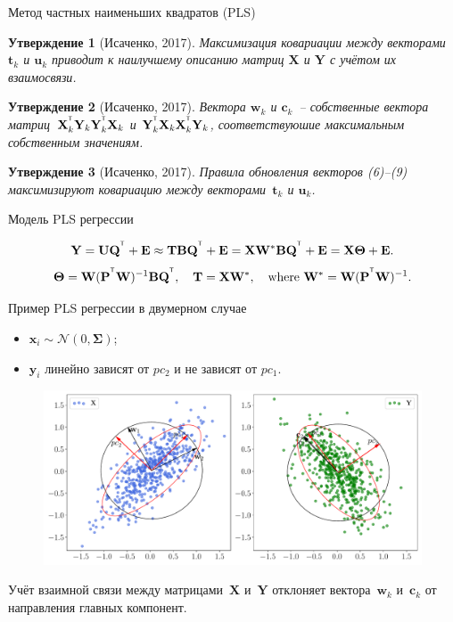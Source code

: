 \documentclass[9pt]{beamer}
\newcommand{\bc}{\mathbf{c}}
\newcommand{\bt}{\mathbf{t}}
\newcommand{\bu}{\mathbf{u}}
\newcommand{\bw}{\mathbf{w}}
\newcommand{\bx}{\mathbf{x}}
\newcommand{\by}{\mathbf{y}}
\newcommand{\bB}{\mathbf{B}}
\newcommand{\bE}{\mathbf{E}}
\newcommand{\bP}{\mathbf{P}}
\newcommand{\bQ}{\mathbf{Q}}
\newcommand{\bT}{\mathbf{T}}
\newcommand{\bU}{\mathbf{U}}
\newcommand{\bW}{\mathbf{W}}
\newcommand{\bX}{\mathbf{X}}
\newcommand{\bY}{\mathbf{Y}}
\newcommand{\bTheta}{\boldsymbol{\Theta}}
\newcommand{\T}{^{\text{\tiny\sffamily\upshape\mdseries T}}}
\newtheorem{statement}{Утверждение}
\begin{document}
\begin{frame}{Метод частных наименьших квадратов (PLS)}

\begin{statement}[Исаченко, 2017]
Максимизация ковариации между векторами~$\bt_k$ и $\bu_k$ приводит к наилучшему описанию матриц $\bX$ и $\bY$ с учётом их взаимосвязи.
\end{statement}
\begin{statement}[Исаченко, 2017]
Вектора $\bw_k$ и $\bc_k$~-- собственные вектора матриц~$\bX_k^{\T} \bY_k \bY_k^{\T} \bX_k$ и $\bY_k^{\T} \bX_k \bX_k^{\T} \bY_k$, соответствуюшие максимальным собственным значениям.
\end{statement}
\begin{statement}[Исаченко, 2017]
Правила обновления векторов (6)--(9) максимизируют ковариацию между векторами~$\bt_k$ и $\bu_k$.
\end{statement}

\begin{block}{Модель PLS регрессии}

\[
\bY = \bU \bQ^{\T} + \bE \approx \bT \bB \bQ^{\T}+ \bE = \bX \bW^* \bB \bQ^{\T} + \bE = \bX \bTheta + \bE.
\]
\vspace{0.1cm}
\[
\bTheta = \bW (\bP^{\T} \bW)^{-1} \bB \bQ^{\T}, \quad \bT = \bX \bW^*, \quad \text{where } \bW^* = \bW (\bP^{\T} \bW)^{-1}.
\]
\end{block}
\end{frame}
\begin{frame}{Пример PLS регрессии в двумерном случае}
	\begin{itemize}
		\item $\bx_i \sim \mathcal{N}(0, \mathbf{\Sigma})$;
		\item $\by_i$ линейно зависят от $pc_2$ и не зависят от $pc_1$.
	\end{itemize}	
	\begin{figure}[h]
	\centering
	\includegraphics[width=\linewidth]{figs/pls_toy_example}
	\end{figure}
	Учёт взаимной связи между матрицами~$\bX$ и~$\bY$ отклоняет вектора~$\bw_k$ и~$\bc_k$ от направления главных компонент. 
\end{frame}
\end{document}
